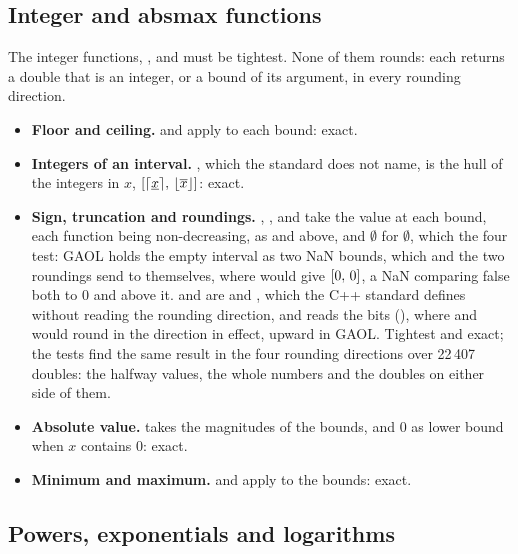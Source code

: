 \documentclass[12pt,a4paper,twoside,openright]{book}
\begin{document}
\subsection{Integer and absmax functions}\label{sec:accuracy-integer}

The integer functions, ,  and  must be
tightest. None of them rounds: each returns a double that is an integer, or
a bound of its argument, in every rounding direction.

\begin{itemize}
\item[$\bullet$] \textbf{Floor and ceiling.}  and
   apply to each bound: exact.
\item[$\bullet$] \textbf{Integers of an interval.} , which
  the standard does not name, is the hull of the integers in $x$,
  $[\lceil\underline{x}\rceil,\,\lfloor\overline{x}\rfloor]$: exact.
\item[$\bullet$] \textbf{Sign, truncation and roundings.} ,
  ,  and
   take the value at each bound, each
  function being non-decreasing, as  and  above, and
  $\emptyset$ for $\emptyset$, which the four test: GAOL holds the empty
  interval as two NaN bounds, which  and the two roundings send
  to themselves, where  would give $[0,\,0]$, a NaN comparing
  false both to $0$ and above it.  and
   are  and ,
  which the C++ standard defines without reading the rounding direction,
  and  reads the bits
  (), where  and
   would round in the direction in effect, upward in
  GAOL.\newinvfive{} Tightest and exact; the tests find the same result in
  the four rounding directions over 22\,407 doubles: the halfway values,
  the whole numbers and the doubles on either side of them.
\item[$\bullet$] \textbf{Absolute value.}  takes the magnitudes
  of the bounds, and $0$ as lower bound when $x$ contains $0$: exact.
\item[$\bullet$] \textbf{Minimum and maximum.}  and
   apply to the bounds: exact.
\end{itemize}

\subsection{Powers, exponentials and logarithms}\label{sec:accuracy-powers}
\end{document}
